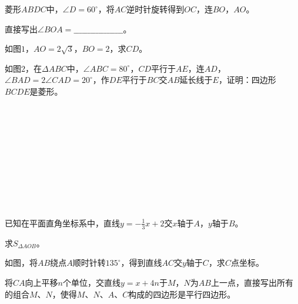 \documentclass[10pt]{article}
\begin{document}
\begin{enumerate}
    \item %
    \begin{compactenum}[(1)]
        \item 菱形$ABDC$中，$\angle D=60^\circ$，将$AC$逆时针旋转得到$OC$，连$BO$，$AO$。
        \begin{compactenum}[(i)]
            \item 直接写出$\angle BOA=\_\_\_\_\_\_\_\_\_\_\_\_\_\_\_\_\_\_$。
            \item 如图$1$，$AO=2\sqrt{3}$，$BO=2$，求$CD$。
        \end{compactenum}
        \item 如图$2$，在$\Delta ABC$中，$\angle ABC=80^\circ$，$CD$平行于$AE$，连$AD$，$\angle BAD = 2\angle CAD = 20^\circ$，作$DE$平行于$BC$交$AB$延长线于$E$，证明：四边形$BCDE$是菱形。\par
        {}
    \end{compactenum}
    \\ \hspace*{\fill} \\\\ \hspace*{\fill} \\\\ \hspace*{\fill} \\\\ \hspace*{\fill} \\\\ \hspace*{\fill} \newpage
    \item 已知在平面直角坐标系中，直线$y=-\frac{1}{3}x+2$交$x$轴于$A$，$y$轴于$B$。
    \begin{compactenum}[(1)]
        \item 求$S_{\Delta AOB}$。
        \item 如图，将$AB$绕点$A$顺时针转$135^\circ$，得到直线$AC$交$y$轴于$C$，求$C$点坐标。
        \item 将$CA$向上平移$n$个单位，交直线$y=x+4n$于$M$，$N$为$AB$上一点，直接写出所有的组合$M$、$N$，使得$M$、$N$、$A$、$C$构成的四边形是平行四边形。\par
        {\centering {}}
    \end{compactenum}
\end{enumerate}
\end{document}
